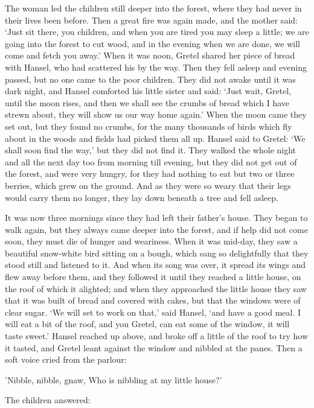 \documentclass[oneside,10pt]{memoir} %
\begin{document}
The woman led the children still deeper into the forest, where they had never in their lives been before. Then a great fire was again made, and the mother said: `Just sit there, you children, and when you are tired you may sleep a little; we are going into the forest to cut wood, and in the evening when we are done, we will come and fetch you away.' When it was noon, Gretel shared her piece of bread with Hansel, who had scattered his by the way. Then they fell asleep and evening passed, but no one came to the poor children. They did not awake until it was dark night, and Hansel comforted his little sister and said: `Just wait, Gretel, until the moon rises, and then we shall see the crumbs of bread which I have strewn about, they will show us our way home again.' When the moon came they set out, but they found no crumbs, for the many thousands of birds which fly about in the woods and fields had picked them all up. Hansel said to Gretel: `We shall soon find the way,' but they did not find it. They walked the whole night and all the next day too from morning till evening, but they did not get out of the forest, and were very hungry, for they had nothing to eat but two or three berries, which grew on the ground. And as they were so weary that their legs would carry them no longer, they lay down beneath a tree and fell asleep.

It was now three mornings since they had left their father's house. They began to walk again, but they always came deeper into the forest, and if help did not come soon, they must die of hunger and weariness. When it was mid-day, they saw a beautiful snow-white bird sitting on a bough, which sang so delightfully that they stood still and listened to it. And when its song was over, it spread its wings and flew away before them, and they followed it until they reached a little house, on the roof of
which it alighted; and when they approached the little house they saw that it was built of bread and covered with cakes, but that the windows were of clear sugar. `We will set to work on that,' said Hansel, `and have a good meal. I will eat a bit of the roof, and you Gretel, can eat some of the window, it will taste sweet.' Hansel reached up above, and broke off a little of the roof to try how it tasted, and Gretel leant against the window and nibbled at the panes. Then a soft voice cried
from the parlour:

'Nibble, nibble, gnaw,
Who is nibbling at my little house?'

The children answered:
\end{document}

